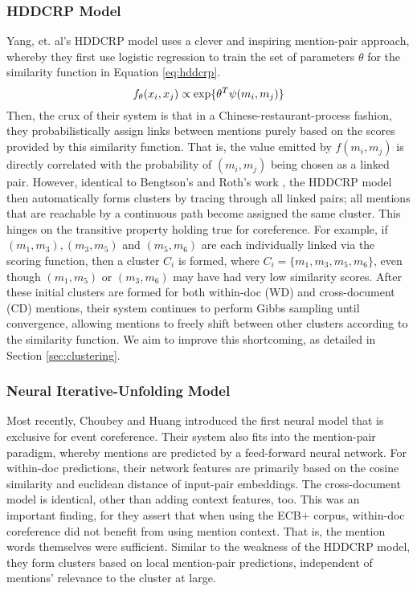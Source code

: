 \documentclass[11pt,a4paper]{article}
\begin{document}
\subsubsection{HDDCRP Model}
Yang, et. al's HDDCRP model  uses a clever and inspiring mention-pair approach, whereby they first use logistic regression to train the set of parameters $\theta$ for the similarity function in Equation \ref{eq:hddcrp}.  
\begin{equation}
\label{eq:hddcrp}
f_{\theta}(x_i,x_j) \propto \textnormal{exp\{} \theta^T\psi(m_i,m_j)\textnormal{\}}
\end{equation}
Then, the crux of their system is that in a Chinese-restaurant-process fashion, they probabilistically assign links between mentions purely based on the scores provided by this similarity function.  That is, the value emitted by $f(m_i,m_j)$ is directly correlated with the probability of $(m_i,m_j)$ being chosen as a linked pair.  However, identical to Bengtson's and Roth's work \cite{Bengtson:2008:UVF:1613715.1613756}, the HDDCRP model then automatically forms clusters by tracing through all linked pairs; all mentions that are reachable by a continuous path become assigned the same cluster.  This hinges on the transitive property holding true for coreference.  For example, if ${(m_1,m_3),(m_3,m_5)}$ and $(m_5,m_6)$ are each individually linked via the scoring function, then a cluster $C_i$ is formed, where $C_i = \{m_1,m_3,m_5,m_6\}$, even though $(m_1,m_5)$ or $(m_3,m_6)$ may have had very low similarity scores.  After these initial clusters are formed for both within-doc (WD) and cross-document (CD) mentions, their system continues to perform Gibbs sampling until convergence, allowing mentions to freely shift between other clusters according to the similarity function.  We aim to improve this shortcoming, as detailed in Section \ref{sec:clustering}.

\subsubsection{Neural Iterative-Unfolding Model}
Most recently, Choubey and Huang  introduced the first neural model that is exclusive for event coreference.  Their system also fits into the mention-pair paradigm, whereby mentions are predicted by a feed-forward neural network. For within-doc predictions, their network features are primarily based on the cosine similarity and euclidean distance of input-pair embeddings.  The cross-document model is identical, other than adding context features, too.  This was an important finding, for they assert that when using the ECB+ corpus, within-doc coreference did not benefit from using mention context.  That is, the mention words themselves were sufficient.  Similar to the weakness of the HDDCRP model, they form clusters based on local mention-pair predictions, independent of mentions' relevance to the cluster at large.
\end{document}
